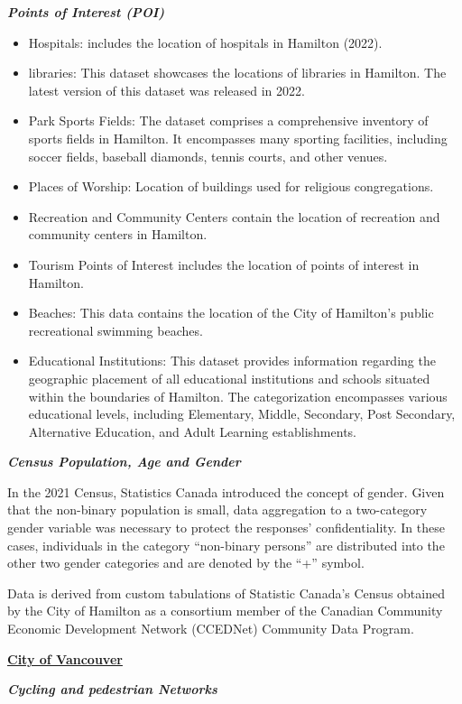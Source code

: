 \documentclass[12pt,twoside]{reedthesis}
\begin{document}
\textbf{\emph{Points of Interest (POI)}}
\begin{itemize}
\item
  Hospitals: includes the location of hospitals in Hamilton (2022).
\item
  libraries: This dataset showcases the locations of libraries in Hamilton. The latest version of this dataset was released in 2022.
\item
  Park Sports Fields: The dataset comprises a comprehensive inventory of sports fields in Hamilton. It encompasses many sporting facilities, including soccer fields, baseball diamonds, tennis courts, and other venues.
\item
  Places of Worship: Location of buildings used for religious congregations.
\item
  Recreation and Community Centers contain the location of recreation and community centers in Hamilton.
\item
  Tourism Points of Interest includes the location of points of interest in Hamilton.
\item
  Beaches: This data contains the location of the City of Hamilton's public recreational swimming beaches.
\item
  Educational Institutions: This dataset provides information regarding the geographic placement of all educational institutions and schools situated within the boundaries of Hamilton. The categorization encompasses various educational levels, including Elementary, Middle, Secondary, Post Secondary, Alternative Education, and Adult Learning establishments.
\end{itemize}
\textbf{\emph{Census Population, Age and Gender}}

In the 2021 Census, Statistics Canada introduced the concept of gender. Given that the non-binary population is small, data aggregation to a two-category gender variable was necessary to protect the responses' confidentiality. In these cases, individuals in the category ``non-binary persons'' are distributed into the other two gender categories and are denoted by the ``+'' symbol.

Data is derived from custom tabulations of Statistic Canada's Census obtained by the City of Hamilton as a consortium member of the Canadian Community Economic Development Network (CCEDNet) Community Data Program.

\textbf{\href{https://opendata.vancouver.ca/explore}{City of Vancouver}}

\textbf{\emph{Cycling and pedestrian Networks}}
\end{document}
